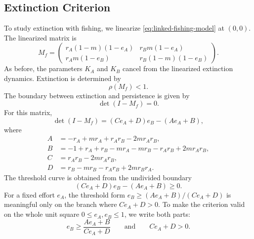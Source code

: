 \documentclass{article}
\numberwithin{equation}{section}
\begin{document}
\subsection{Extinction Criterion}
To study extinction with fishing, we linearize
\eqref{eq:linked-fishing-model} at $(0,0)$. The linearized matrix is
\begin{equation}
    \label{eq:linked-fishing-linear-matrix}
    M_f=
    \begin{pmatrix}
        r_A(1-m)(1-e_A) & r_Bm(1-e_A)\\
        r_Am(1-e_B) & r_B(1-m)(1-e_B)
    \end{pmatrix}.
\end{equation}
As before, the parameters $K_A$ and $K_B$ cancel from the linearized
extinction dynamics. Extinction is determined by
\begin{equation}
    \label{eq:linked-fishing-spectral-criterion}
    \rho(M_f)<1.
\end{equation}
The boundary between extinction and persistence is given by
\begin{equation*}
    \det(I-M_f)=0.
\end{equation*}
For this matrix,
\begin{equation}
    \label{eq:linked-fishing-det-boundary}
    \det(I-M_f)=(Ce_A+D)e_B-(Ae_A+B),
\end{equation}
where
\begin{equation*}
    \begin{aligned}
        A &= -r_A + mr_A + r_Ar_B - 2mr_Ar_B,\\
        B &= -1 + r_A + r_B - mr_A - mr_B - r_Ar_B + 2mr_Ar_B,\\
        C &= r_Ar_B - 2mr_Ar_B,\\
        D &= r_B - mr_B - r_Ar_B + 2mr_Br_A.
    \end{aligned}
\end{equation*}
The threshold curve is obtained from the undivided boundary
\begin{equation}
    \label{eq:linked-fishing-det-condition}
    (Ce_A+D)e_B-(Ae_A+B)\geq0.
\end{equation}
For a fixed effort $e_A$, the threshold form
$e_B\geq(Ae_A+B)/(Ce_A+D)$ is meaningful only on the branch where
$Ce_A+D>0$. To make the criterion valid on the whole unit square
$0\leq e_A,e_B\leq1$, we write both parts:
\begin{equation}
    \label{eq:linked-fishing-eb-threshold}
    e_B\geq\frac{Ae_A+B}{Ce_A+D}
    \qquad\text{and}\qquad
    Ce_A+D>0.
\end{equation}
\end{document}
